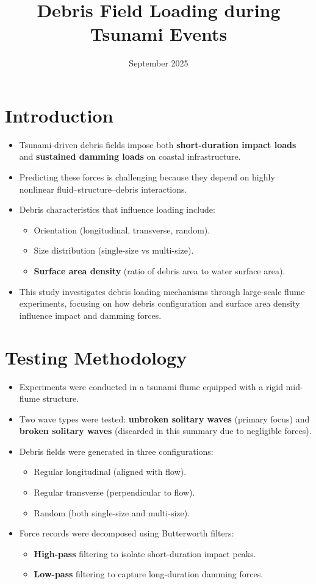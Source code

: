 \documentclass{article}
\title{Debris Field Loading during Tsunami Events}
\date{September 2025}
\begin{document}
\maketitle

\section{Introduction}
\begin{itemize}
    \item Tsunami-driven debris fields impose both \textbf{short-duration impact loads} and \textbf{sustained damming loads} on coastal infrastructure.
    \item Predicting these forces is challenging because they depend on highly nonlinear fluid–structure–debris interactions.
    \item Debris characteristics that influence loading include:
    \begin{itemize}
        \item Orientation (longitudinal, transverse, random).
        \item Size distribution (single-size vs multi-size).
        \item \textbf{Surface area density} (ratio of debris area to water surface area).
    \end{itemize}
    \item This study investigates debris loading mechanisms through large-scale flume experiments, focusing on how debris configuration and surface area density influence impact and damming forces.
\end{itemize}

\section{Testing Methodology}
\begin{itemize}
    \item Experiments were conducted in a tsunami flume equipped with a rigid mid-flume structure.
    \item Two wave types were tested: \textbf{unbroken solitary waves} (primary focus) and \textbf{broken solitary waves} (discarded in this summary due to negligible forces).
    \item Debris fields were generated in three configurations:
    \begin{itemize}
        \item Regular longitudinal (aligned with flow).
        \item Regular transverse (perpendicular to flow).
        \item Random (both single-size and multi-size).
    \end{itemize}
    \item Force records were decomposed using Butterworth filters:
    \begin{itemize}
        \item \textbf{High-pass} filtering to isolate short-duration impact peaks.
        \item \textbf{Low-pass} filtering to capture long-duration damming forces.
    \end{itemize}
\end{itemize}
\end{document}
